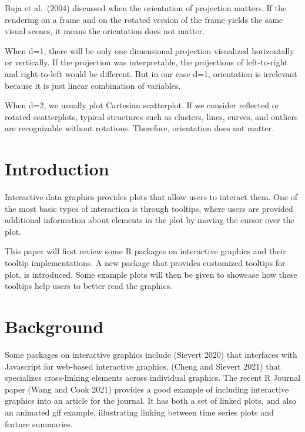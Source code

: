 Buja et al.~(2004) discussed when the orientation of projection matters. If the rendering on a frame and on the rotated version of the frame yields the same visual scenes, it means the orientation does not matter.

When d=1, there will be only one dimensional projection visualized horizontally or vertically. If the projection was interpretable, the projections of left-to-right and right-to-left would be different. But in our case d=1, orientation is irrelevant because it is just linear combination of variables.

When d=2, we usually plot Cartesian scatterplot. If we consider reflected or rotated scatterplots, typical structures such as clusters, lines, curves, and outliers are recognizable without rotations. Therefore, orientation does not matter.

\hypertarget{introduction-1}{%
\section{Introduction}\label{introduction-1}}

Interactive data graphics provides plots that allow users to interact them. One of the most basic types of interaction is through tooltips, where users are provided additional information about elements in the plot by moving the cursor over the plot.

This paper will first review some R packages on interactive graphics and their tooltip implementations. A new package  that provides customized tooltips for plot, is introduced. Some example plots will then be given to showcase how these tooltips help users to better read the graphics.

\hypertarget{background-1}{%
\section{Background}\label{background-1}}

Some packages on interactive graphics include  (Sievert 2020) that interfaces with Javascript for web-based interactive graphics,  (Cheng and Sievert 2021) that specializes cross-linking elements across individual graphics. The recent R Journal paper  (Wang and Cook 2021) provides a good example of including interactive graphics into an article for the journal. It has both a set of linked plots, and also an animated gif example, illustrating linking between time series plots and feature summaries.

